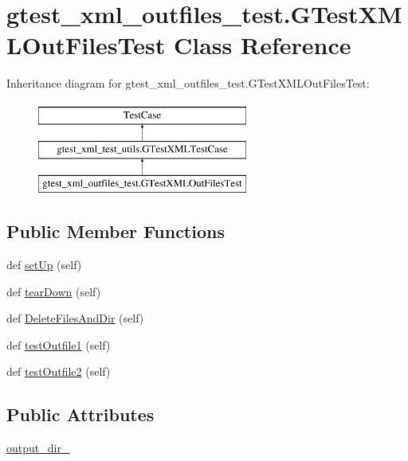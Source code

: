 \hypertarget{classgtest__xml__outfiles__test_1_1GTestXMLOutFilesTest}{}\section{gtest\+\_\+xml\+\_\+outfiles\+\_\+test.\+G\+Test\+X\+M\+L\+Out\+Files\+Test Class Reference}
\label{classgtest__xml__outfiles__test_1_1GTestXMLOutFilesTest}
Inheritance diagram for gtest\+\_\+xml\+\_\+outfiles\+\_\+test.\+G\+Test\+X\+M\+L\+Out\+Files\+Test\+:\begin{figure}[H]
\begin{center}
\leavevmode
\includegraphics[height=3.000000cm]{classgtest__xml__outfiles__test_1_1GTestXMLOutFilesTest}
\end{center}
\end{figure}
\subsection*{Public Member Functions}
\begin{DoxyCompactItemize}
\item 
def \mbox{\hyperlink{classgtest__xml__outfiles__test_1_1GTestXMLOutFilesTest_a56550f293277d18c36e868a637fe1153}{set\+Up}} (self)
\item 
def \mbox{\hyperlink{classgtest__xml__outfiles__test_1_1GTestXMLOutFilesTest_a49d1d410370ba8a3cfcc281eaadb5706}{tear\+Down}} (self)
\item 
def \mbox{\hyperlink{classgtest__xml__outfiles__test_1_1GTestXMLOutFilesTest_a503d2fbc9cd782ae57ac4307d2db43e1}{Delete\+Files\+And\+Dir}} (self)
\item 
def \mbox{\hyperlink{classgtest__xml__outfiles__test_1_1GTestXMLOutFilesTest_a034738bbc00ac46d00f183402c561228}{test\+Outfile1}} (self)
\item 
def \mbox{\hyperlink{classgtest__xml__outfiles__test_1_1GTestXMLOutFilesTest_a3c02687f092a482d0d0260c7ed94c618}{test\+Outfile2}} (self)
\end{DoxyCompactItemize}
\subsection*{Public Attributes}
\begin{DoxyCompactItemize}
\item 
\mbox{\hyperlink{classgtest__xml__outfiles__test_1_1GTestXMLOutFilesTest_aa5c31cd97047bc1d3060f4d27bc956a4}{output\+\_\+dir\+\_\+}}
\end{DoxyCompactItemize}
